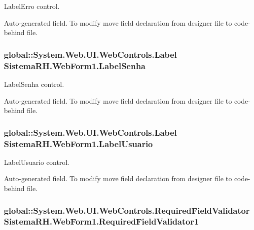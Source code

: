 LabelErro control. 

Auto-\/generated field. To modify move field declaration from designer file to code-\/behind file. \hypertarget{class_sistema_r_h_1_1_web_form1_af8a14b0d5f77d4865f02acc042bd3b51}{
\subsubsection[{LabelSenha}]{\setlength{\rightskip}{0pt plus 5cm}global::System.Web.UI.WebControls.Label {\bf SistemaRH.WebForm1.LabelSenha}}}
\label{class_sistema_r_h_1_1_web_form1_af8a14b0d5f77d4865f02acc042bd3b51}


LabelSenha control. 

Auto-\/generated field. To modify move field declaration from designer file to code-\/behind file. \hypertarget{class_sistema_r_h_1_1_web_form1_a27359ed50632d923f2355acf79d847fc}{
\subsubsection[{LabelUsuario}]{\setlength{\rightskip}{0pt plus 5cm}global::System.Web.UI.WebControls.Label {\bf SistemaRH.WebForm1.LabelUsuario}}}
\label{class_sistema_r_h_1_1_web_form1_a27359ed50632d923f2355acf79d847fc}


LabelUsuario control. 

Auto-\/generated field. To modify move field declaration from designer file to code-\/behind file. \hypertarget{class_sistema_r_h_1_1_web_form1_a47c7703d71ff9afbabeed0c9336f9c08}{
\subsubsection[{RequiredFieldValidator1}]{\setlength{\rightskip}{0pt plus 5cm}global::System.Web.UI.WebControls.RequiredFieldValidator {\bf SistemaRH.WebForm1.RequiredFieldValidator1}}}
\label{class_sistema_r_h_1_1_web_form1_a47c7703d71ff9afbabeed0c9336f9c08}


